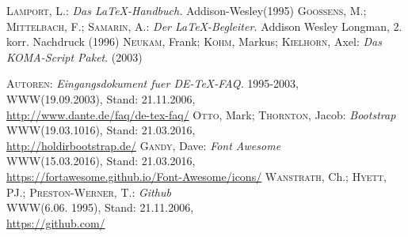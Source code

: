 

\begin{thebibliography}{999}
\textsc{Lamport}, L.: \textit{Das \LaTeX-Handbuch.} Addison-Wesley(1995)  
	 \textsc{Goossens}, M.; \textsc{Mittelbach}, F.; \textsc{Samarin}, A.: \textit{Der \LaTeX-Begleiter.} Addison Wesley Longman, 2.\,korr. Nachdruck (1996)
 \textsc{Neukam}, Frank; \textsc{Kohm}, Markus; \textsc{Kielhorn}, Axel: \textit{Das KOMA-Script Paket}. (2003)	
			 		
 \textsc{Autoren}: \textit{Eingangsdokument fuer DE-TeX-FAQ.} 1995-2003,\\ 
			{\small WWW(19.09.2003), Stand: 21.11.2006,}\\ 
			\url{http://www.dante.de/faq/de-tex-faq/}
 \textsc{Otto}, Mark; \textsc{Thornton}, Jacob: \textit{Bootstrap}\\
			{\small WWW(19.03.1016), Stand: 21.03.2016,}\\
			\url{http://holdirbootstrap.de/}
 \textsc{Gandy}, Dave: \textit{Font Awesome}\\
			{\small WWW(15.03.2016), Stand: 21.03.2016,} \\
			\url{https://fortawesome.github.io/Font-Awesome/icons/}
 \textsc{Wanstrath}, Ch.; \textsc{Hyett}, PJ.; \textsc{Preston-Werner}, T.:  \textit{Github}\\ 
			{\small WWW(6.06. 1995), Stand: 21.11.2006,}\\ 			
			\url{https://github.com/}
	
\end{thebibliography}
